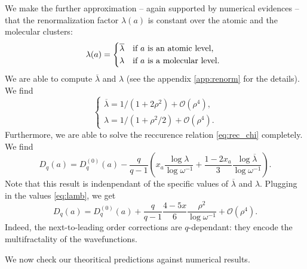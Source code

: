 \documentclass[11pt]{article}
\newcommand{\lb}{\ensuremath{\overline{\lambda}}}
\begin{document}
We make the further approximation -- again supported by numerical evidences -- that the renormalization factor $\lambda(a)$ is constant over the atomic and the molecular clusters:
\begin{equation}
	\lambda(a) = \begin{cases*}
	\lb & if $a$ is an atomic level, \\
	\lambda & if $a$ is a molecular level. \\
	\end{cases*}
\end{equation}
We are able to compute $\lb$ and $\lambda$ (see the appendix \eqref{app:renorm} for the details). We find
\begin{equation}
\label{eq:lamb}
	\begin{cases}
		\lb = 1/(1+2\rho^2) + \mathcal{O}(\rho^4), \\
		\lambda = 1/(1+\rho^2/2) + \mathcal{O}(\rho^4).
	\end{cases}
\end{equation}
Furthermore, we are able to solve the reccurence relation \eqref{eq:rec_chi} completely. We find
\begin{equation}
	D_q(a) = D_q^{(0)}(a) - \frac{q}{q-1} \left( x_a \frac{\log \lambda}{\log \omega^{-1}} + \frac{1-2x_a}{3}\frac{\log \lb}{\log \omega^{-1}} \right).
\end{equation}
Note that this result is indenpendant of the specific values of $\lb$ and $\lambda$.
Plugging in the values \eqref{eq:lamb}, we get
\begin{equation}
\label{eq:dqpsi2}
	D_q(a) = D_q^{(0)}(a) + \frac{q}{q-1} \frac{4-5x}{6} \frac{\rho^2}{\log \omega^{-1}} + \mathcal{O}(\rho^4).
\end{equation}
Indeed, the next-to-leading order corrections are $q$-dependant: they encode the multifractality of the wavefunctions.

We now check our theoritical predictions against numerical results.
\end{document}
